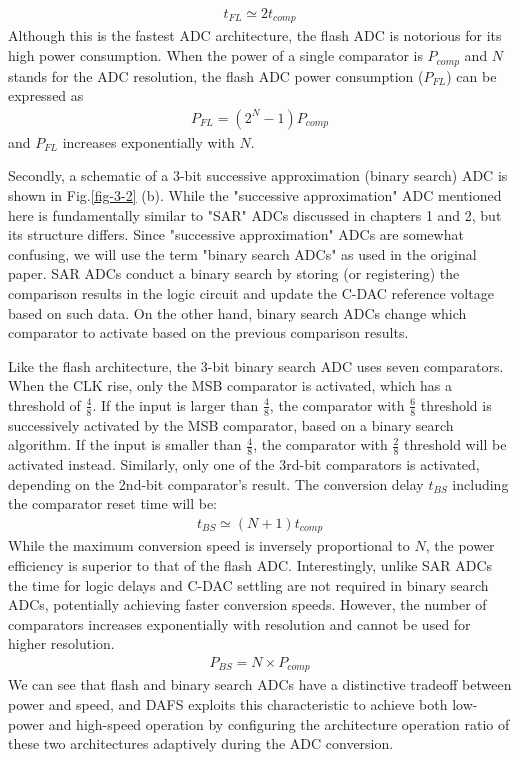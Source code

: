 \begin{eqnarray}
  t_{FL} \simeq 2t_{comp}
\end{eqnarray}
Although this is the fastest ADC architecture, the flash ADC is notorious for its high power consumption. When the power of a single comparator is $P_{comp}$ and $N$ stands for the ADC resolution, the flash ADC power consumption ($P_{FL}$) can be expressed as
\begin{eqnarray}
  P_{FL} = (2^N - 1)P_{comp}
\end{eqnarray}
and $P_{FL}$ increases exponentially with $N$.

Secondly, a schematic of a 3-bit successive approximation (binary search) ADC is shown in Fig.\ref{fig-3-2} (b). 
While the "successive approximation" ADC mentioned here is fundamentally similar to "SAR" ADCs discussed in chapters 1 and 2, but its structure differs.
Since "successive approximation" ADCs are somewhat confusing, we will use the term "binary search ADCs" as used in the original paper.
SAR ADCs conduct a binary search by storing (or registering) the comparison results in the logic circuit and update the C-DAC reference voltage based on such data.
On the other hand, binary search ADCs change which comparator to activate based on the previous comparison results.

Like the flash architecture, the 3-bit binary search ADC uses seven comparators. When the CLK rise, only the MSB comparator is activated, which has a threshold of $\frac{4}{8}$. If the input is larger than $\frac{4}{8}$, the comparator with $\frac{6}{8}$ threshold is successively activated by the MSB comparator, based on a binary search algorithm. If the input is smaller than $\frac{4}{8}$, the comparator with $\frac{2}{8}$ threshold will be activated instead. Similarly, only one of the 3rd-bit comparators is activated, depending on the 2nd-bit comparator’s result. The conversion delay $t_{BS}$ including the comparator reset time will be:
\begin{eqnarray}
  t_{BS} \simeq (N+1)t_{comp}
\end{eqnarray}
While the maximum conversion speed is inversely proportional to $N$, the power efficiency is superior to that of the flash ADC.
Interestingly, unlike SAR ADCs the time for logic delays and C-DAC settling are not required in binary search ADCs, potentially achieving faster conversion speeds. However, the number of comparators increases exponentially with resolution and cannot be used for higher resolution.
\begin{eqnarray}
  P_{BS} = N \times P_{comp}
\end{eqnarray}
We can see that flash and binary search ADCs have a distinctive tradeoff between power and speed, and DAFS exploits this characteristic to achieve both low-power and high-speed operation by configuring the architecture operation ratio of these two architectures adaptively during the ADC conversion. 

